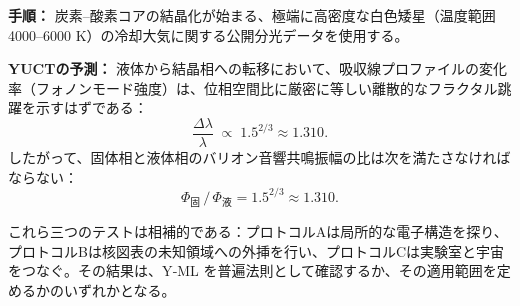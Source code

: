 \documentclass[11pt,a4paper]{article}
\begin{document}
	\textbf{手順：} 炭素–酸素コアの結晶化が始まる、極端に高密度な白色矮星（温度範囲 4000–6000 K）の冷却大気に関する公開分光データを使用する。
	
	\textbf{YUCTの予測：} 液体から結晶相への転移において、吸収線プロファイルの変化率（フォノンモード強度）は、位相空間比に厳密に等しい離散的なフラクタル跳躍を示すはずである：
	\begin{equation}
		\frac{\Delta \lambda}{\lambda} \;\propto\; 1.5^{2/3} \approx 1.310 .
	\end{equation}
	したがって、固体相と液体相のバリオン音響共鳴振幅の比は次を満たさなければならない：
	\begin{equation}
		\Phi_{\text{固}} \,/\, \Phi_{\text{液}} = 1.5^{2/3} \approx 1.310 .
	\end{equation}
	
	これら三つのテストは相補的である：プロトコルAは局所的な電子構造を探り、プロトコルBは核図表の未知領域への外挿を行い、プロトコルCは実験室と宇宙をつなぐ。その結果は、Y‑ML を普遍法則として確認するか、その適用範囲を定めるかのいずれかとなる。
	
\end{document}
